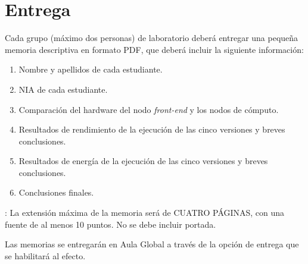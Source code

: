 \section{Entrega}

Cada grupo (máximo dos personas) de laboratorio deberá entregar una pequeña memoria
descriptiva en formato PDF, que deberá incluir la siguiente información:

\begin{enumerate}
  \item Nombre y apellidos de cada estudiante.
  \item NIA de cada estudiante.
  \item Comparación del hardware del nodo \emph{front-end} y los nodos de cómputo.
  \item Resultados de rendimiento de la ejecución de las cinco versiones y breves conclusiones.
  \item Resultados de energía de la ejecución de las cinco versiones y breves conclusiones.
  \item Conclusiones finales.
\end{enumerate}

: La extensión máxima de la memoria será de CUATRO PÁGINAS,
                      con una fuente de al menos 10 puntos. No se debe incluir
                      portada.

Las memorias se entregarán en Aula Global a través de la opción de entrega que se 
habilitará al efecto.
